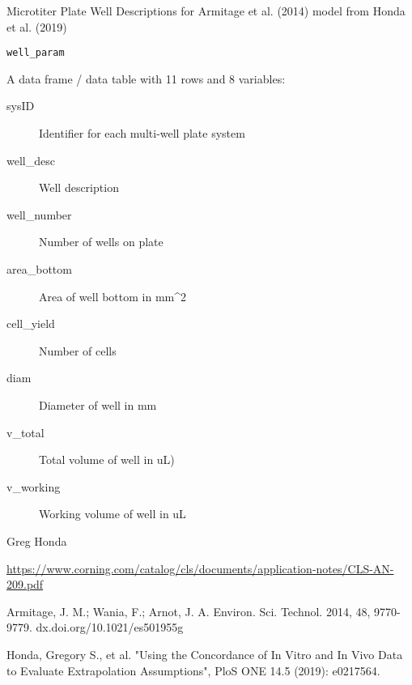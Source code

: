 \documentclass[a4paper]{book}
\begin{document}
%
\begin{Description}\relax
Microtiter Plate Well Descriptions for Armitage et al. (2014) model from
Honda et al. (2019)
\end{Description}
%
\begin{Usage}
\begin{verbatim}
well_param
\end{verbatim}
\end{Usage}
%
\begin{Format}
A data frame / data table with 11 rows and 8 variables:
\begin{description}

\item[sysID] Identifier for each multi-well plate system
\item[well\_desc] Well description
\item[well\_number] Number of wells on plate
\item[area\_bottom] Area of well bottom in mm\textasciicircum{}2
\item[cell\_yield] Number of cells
\item[diam] Diameter of well in mm
\item[v\_total] Total volume of well in uL)
\item[v\_working] Working volume of well in uL

\end{description}

\end{Format}
%
\begin{Author}\relax
Greg Honda
\end{Author}
%
\begin{Source}\relax
\url{https://www.corning.com/catalog/cls/documents/application-notes/CLS-AN-209.pdf}
\end{Source}
%
\begin{References}\relax
Armitage, J. M.; Wania, F.; Arnot, J. A. Environ. Sci. Technol.
2014, 48, 9770-9779. dx.doi.org/10.1021/es501955g

Honda, Gregory S., et al. "Using the Concordance of In Vitro and
In Vivo Data to Evaluate Extrapolation Assumptions", PloS ONE 14.5 (2019): e0217564.
\end{References}
\end{document}
